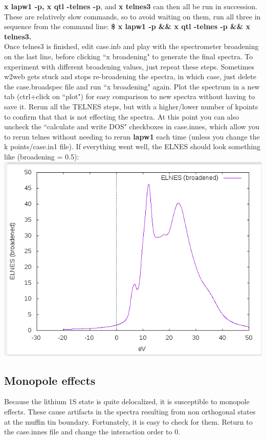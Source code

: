 \documentclass[12pt]{article}
\begin{document}
\textbf{x lapw1 -p, x qtl -telnes -p}, and\textbf{ x telnes3} can then all be run in succession.  These are relatively slow commands, so to avoid waiting on them, run all three in sequence from the command line: \textbf{\$ x lapw1 -p \&\& x qtl -telnes -p \&\& x telnes3.}\\

Once telnes3 is finished, edit case.inb and play with the spectrometer broadening on the last line, before clicking ``x broadening" to generate the final spectra. To experiment with different broadening values, just repeat these steps.  Sometimes w2web gets stuck and stops re-broadening the spectra, in which case, just delete the case.broadspec file and run ``x broadening" again.   Plot the spectrum in a new tab (ctrl+click on ``plot") for easy comparison to new spectra without having to save it. Rerun all the TELNES steps, but with a higher/lower number of kpoints to confirm that that is not effecting the spectra. At this point you can also uncheck the ``calculate and write DOS" checkboxes in case.innes, which allow you to rerun telnes without needing to rerun\textbf{ lapw1} each time (unless you change the k points/case.in1 file).  If everything went well, the ELNES should look something like (broadening = 0.5):   \\

\includegraphics[scale=0.4]{./images/Li_edge_no-hole.png}

\subsection{Monopole effects}
Because the lithium 1S state is quite delocalized, it is susceptible to monopole effects.  These cause artifacts in the spectra resulting from non orthogonal states at the muffin tin boundary.  Fortunately, it is easy to check for them.  Return to the case.innes file and change the interaction order to 0. \\
\end{document}
